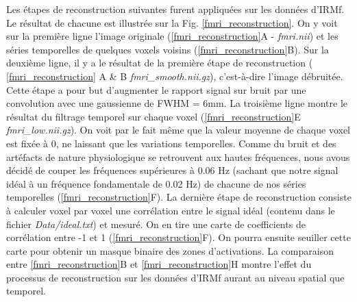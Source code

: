 \documentclass[a4paper]{article}
\begin{document}
Les étapes de reconstruction suivantes furent appliquées sur les données d'IRMf. Le résultat de chacune est illustrée sur la Fig. \ref{fmri_reconstruction}. On y voit sur la première ligne l'image originale (\ref{fmri_reconstruction}A - \emph{fmri.nii}) et les séries temporelles de quelques voxels voisins (\ref{fmri_reconstruction}B). Sur la deuxième ligne, il y a le résultat de la première étape de reconstruction ( \ref{fmri_reconstruction} A \& B \emph{fmri\_smooth.nii.gz}), c'est-à-dire l'image débruitée. Cette étape a pour but d'augmenter le rapport signal sur bruit par une convolution avec une gaussienne de FWHM = 6mm.
La troisième ligne montre le résultat du filtrage temporel sur chaque voxel (\ref{fmri_reconstruction}E \emph{fmri\_low.nii.gz}). On voit par le fait même que la valeur moyenne de chaque voxel est fixée à 0, ne laissant que les variations temporelles. Comme du bruit et des artéfacts de nature physiologique se retrouvent aux hautes fréquences, nous avous décidé de couper les fréquences supérieures à 0.06 Hz (sachant que notre signal idéal à un fréquence fondamentale de 0.02 Hz) de chacune de nos séries temporelles (\ref{fmri_reconstruction}F).
La dernière étape de reconstruction consiste à calculer voxel par voxel une corrélation entre le signal idéal (contenu dans le fichier \emph{Data/ideal.txt}) et mesuré.  On en tire une carte de coefficients de corrélation entre -1 et 1 (\ref{fmri_reconstruction}F). On pourra ensuite seuiller cette carte pour obtenir un masque binaire des zones d'activations. La comparaison entre \ref{fmri_reconstruction}B et \ref{fmri_reconstruction}H montre l'effet du processus de reconstruction sur les données d'IRMf aurant au niveau spatial que temporel.
\end{document}
